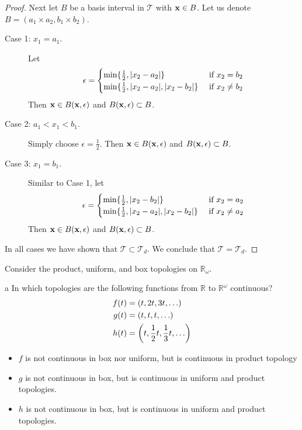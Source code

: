 \documentclass[11pt]{article}
\begin{document}
\begin{proof}
  Next let $B$ be a basis interval in $\mathcal{T}$ with $\vb x \in B$. Let us
  denote $B = (a_1 \times a_2, b_1 \times b_2)$.
  \begin{description}
    \item[Case 1: $x_1 = a_1$.]
      Let
      \[ \epsilon =
        \begin{cases}
          \min\{\frac{1}{2}, \abs{x_2 - a_2}\} &\text{ if } x_2 = b_2 \\
          \min\{\frac{1}{2}, \abs{x_2 - a_2}, \abs{x_2 - b_2}\} &\text{ if } x_2 \neq b_2
        \end{cases}
      \]
      Then $\vb x \in B(\vb x, \epsilon)$ and $B(\vb x, \epsilon) \subset B$.
    \item[Case 2: $a_1 < x_1 < b_1$.]
      Simply choose $\epsilon = \frac{1}{2}$.  Then $\vb x \in B(\vb x,
      \epsilon)$ and $B(\vb x, \epsilon) \subset B$.
    \item[Case 3: $x_1 = b_1$.] Similar to Case 1, let
      \[ \epsilon =
        \begin{cases}
          \min\{\frac{1}{2}, \abs{x_2 - b_2}\} &\text{ if } x_2 = a_2 \\
          \min\{\frac{1}{2}, \abs{x_2 - a_2}, \abs{x_2 - b_2}\} &\text{ if } x_2 \neq a_2
        \end{cases}
      \]
      Then $\vb x \in B(\vb x, \epsilon)$ and $B(\vb x, \epsilon) \subset B$.
  \end{description}
  In all cases we have shown that $\mathcal{T} \subset \mathcal{T}_d$. We
  conclude that $\mathcal{T} = \mathcal{T}_d$.
\end{proof}

\begin{ex}{20.4}
  Consider the product, uniform, and box topologies on $\mathbb{R}_\omega$.
\end{ex}

\begin{p}{a}
  In which topologies are the following functions from $\mathbb{R}$ to
  $\mathbb{R}^\omega$ continuous?
  \begin{align*}
    f(t) &= \qty(t, 2t, 3t, \ldots) \\
    g(t) &= \qty(t, t, t, \ldots) \\
    h(t) &= \qty(t, \frac{1}{2}t, \frac{1}{3}t, \ldots)
  \end{align*}
\end{p}

\begin{itemize}
  \item $f$ is not continuous in box nor uniform, but is continuous in product
    topology
  \item $g$ is not continuous in box, but is continuous in uniform and product
    topologies.
  \item $h$ is not continuous in box, but is continuous in uniform and product
    topologies.
\end{itemize}
\end{document}
